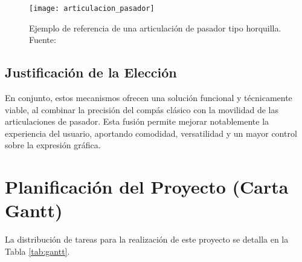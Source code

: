 \documentclass[11pt, a4paper]{article}
\begin{document}
\begin{figure}[htbp]
    \centering
    \texttt{[image: articulacion\_pasador]}
    \caption{Ejemplo de referencia de una articulación de pasador tipo horquilla. Fuente: \cite{ref_img_articulacion}}
    \label{fig:ref_articulacion}
\end{figure}
\bigskip

\subsection{Justificación de la Elección}
En conjunto, estos mecanismos ofrecen una solución funcional y técnicamente viable, al combinar la precisión del compás clásico con la movilidad de las articulaciones de pasador. Esta fusión permite mejorar notablemente la experiencia del usuario, aportando comodidad, versatilidad y un mayor control sobre la expresión gráfica.
\bigskip


\section{Planificación del Proyecto (Carta Gantt)}
La distribución de tareas para la realización de este proyecto se detalla en la Tabla \ref{tab:gantt}.
\smallskip
\end{document}
